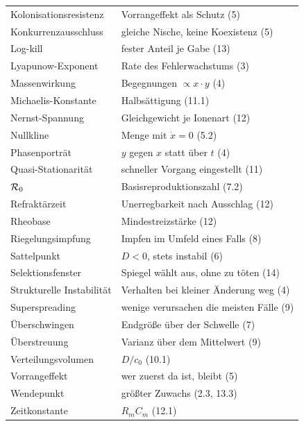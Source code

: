 \begin{merksatz}
\begin{center}
{\begin{longtable}{@{}P{3.6cm}P{5.0cm}@{}}
Kolonisations\-resistenz & Vorrangeffekt als Schutz (5)\\
Konkurrenz\-ausschluss & gleiche Nische, keine Koexistenz (5)\\
Log-kill & fester Anteil je Gabe (13)\\
Lyapunow-Exponent & Rate des Fehlerwachstums (3)\\
Massenwirkung & Begegnungen $\propto x\cdot y$ (4)\\
Michaelis-Konstante & Halbsättigung (11.1)\\
Nernst-Spannung & Gleichgewicht je Ionenart (12)\\
Nullkline & Menge mit $\dot x = 0$ (5.2)\\
Phasenporträt & $y$ gegen $x$ statt über $t$ (4)\\
Quasi-Stationarität & schneller Vorgang eingestellt (11)\\
$\mathcal{R}_0$ & Basisreproduktionszahl (7.2)\\
Refraktärzeit & Unerregbarkeit nach Ausschlag (12)\\
Rheobase & Mindestreizstärke (12)\\
Riegelungsimpfung & Impfen im Umfeld eines Falls (8)\\
Sattelpunkt & $D<0$, stets instabil (6)\\
Selektionsfenster & Spiegel wählt aus, ohne zu töten (14)\\
Strukturelle In\-stabilität & Verhalten bei kleiner Änderung weg (4)\\
Superspreading & wenige verursachen die meisten Fälle (9)\\
Überschwingen & Endgröße über der Schwelle (7)\\
Überstreuung & Varianz über dem Mittelwert (9)\\
Verteilungs\-volumen & $D/c_0$ (10.1)\\
Vorrangeffekt & wer zuerst da ist, bleibt (5)\\
Wendepunkt & größter Zuwachs (2.3, 13.3)\\
Zeitkonstante & $R_mC_m$ (12.1)\\
\bottomrule
\end{longtable}}
\end{center}
\end{merksatz}
